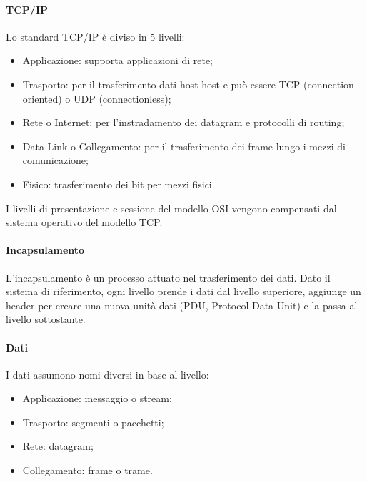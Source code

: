 \documentclass{subfiles}
\begin{document}
    \paragraph{TCP/IP}
    Lo standard TCP/IP è diviso in 5 livelli:
    \begin{itemize}
        \item Applicazione: supporta applicazioni di rete;
        \item Trasporto: per il trasferimento dati host-host e può essere TCP (connection oriented) o UDP (connectionless);
        \item Rete o Internet: per l'instradamento dei datagram e protocolli di routing;
        \item Data Link o Collegamento: per il trasferimento dei frame lungo i mezzi di comunicazione;
        \item Fisico: trasferimento dei bit per mezzi fisici.
    \end{itemize}
    
    \begin{Note*}
        I livelli di presentazione e sessione del modello OSI vengono compensati dal sistema operativo del modello TCP.
    \end{Note*}
    
    \paragraph{Incapsulamento}
    L'incapsulamento è un processo attuato nel trasferimento dei dati. Dato il sistema di riferimento, ogni livello prende i dati dal 
    livello superiore, aggiunge un header per creare una nuova unità dati (PDU, Protocol Data Unit) e la passa al livello sottostante.
    
    \paragraph{Dati}
    I dati assumono nomi diversi in base al livello:
    \begin{itemize}
        \item Applicazione: messaggio o stream;
        \item Trasporto: segmenti o pacchetti;
        \item Rete: datagram;
        \item Collegamento: frame o trame.
    \end{itemize}
\end{document}
